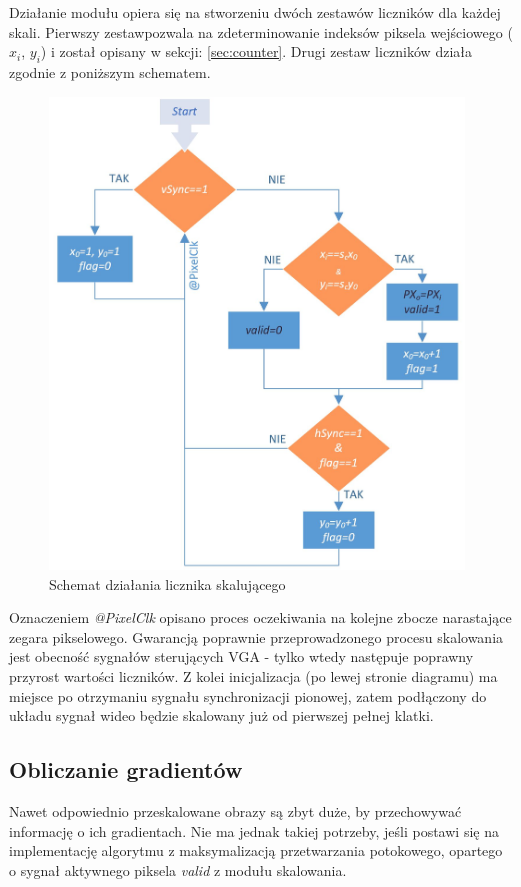 Działanie modułu opiera się na stworzeniu dwóch zestawów liczników dla każdej skali. Pierwszy zestawpozwala na zdeterminowanie indeksów piksela wejściowego ($x_i$, $y_i$) i został opisany w sekcji: \ref{sec:counter}. \newline
Drugi zestaw liczników działa zgodnie z poniższym schematem.
\begin{figure}[!h]
	\centering
	\includegraphics[width=11cm]{4_scaling.jpg}
	\caption{Schemat działania licznika skalującego}
	\label{fig:scaling_sch}
\end{figure}
Oznaczeniem \textit{@PixelClk} opisano proces oczekiwania na kolejne zbocze narastające zegara pikselowego. Gwarancją poprawnie przeprowadzonego procesu skalowania jest obecność sygnałów sterujących VGA - tylko wtedy następuje poprawny przyrost wartości liczników. Z kolei inicjalizacja (po lewej stronie diagramu) ma miejsce po otrzymaniu sygnału synchronizacji pionowej, zatem podłączony do układu sygnał wideo będzie skalowany już od pierwszej pełnej klatki.

\subsection{Obliczanie gradientów}
Nawet odpowiednio przeskalowane obrazy są zbyt duże, by przechowywać informację o ich gradientach. Nie ma jednak takiej potrzeby, jeśli postawi się na implementację algorytmu z maksymalizacją przetwarzania potokowego, opartego o sygnał aktywnego piksela \textit{valid} z modułu skalowania.

